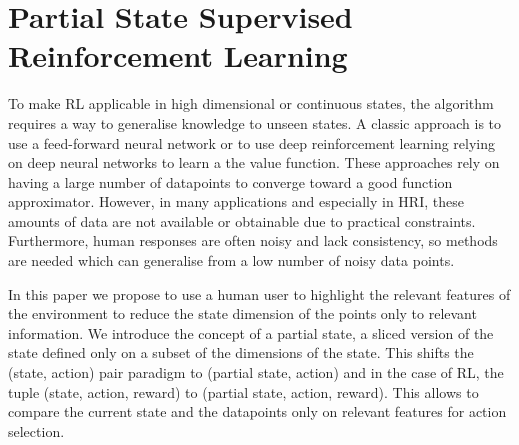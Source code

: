 \documentclass[letterpaper]{article} %
\begin{document}
\section{Partial State Supervised Reinforcement Learning}

To make RL applicable in high dimensional or continuous states, the algorithm
requires a way to generalise knowledge to unseen states. 
A classic approach is to use a feed-forward neural
network or to use deep reinforcement learning relying on deep neural
networks to learn a the value function. 
These approaches rely on having a large number of
datapoints to converge toward a good function approximator. However, 
 in many applications and especially in HRI, these amounts of data are not
available or obtainable due to practical constraints. Furthermore, human responses are often noisy and lack consistency, so methods are needed which can generalise from a low number of noisy data points.


In this paper we propose to use a human user to highlight the relevant features of
the environment to reduce the state dimension of the points only to relevant
information.
We introduce the concept of a partial state, a sliced version of the state defined
only on a subset of the dimensions of the state. This shifts the (state, action)
pair paradigm to (partial state, action)  
and in the case of RL, the tuple (state, action, reward) to (partial state,
action, reward). This allows to compare the current state and the
datapoints only on relevant features for action selection.
\end{document}
